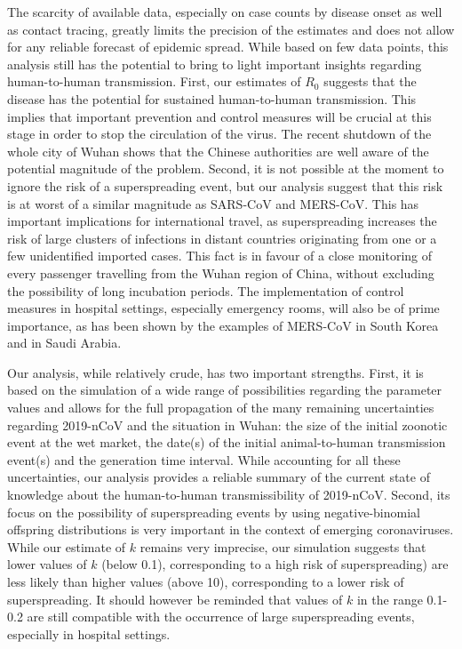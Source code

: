 \documentclass{article}
\begin{document}
The scarcity of available data, especially on case counts by disease onset as well as contact tracing, greatly limits the precision of the estimates and does not allow for any reliable forecast of epidemic spread.
While based on few data points, this analysis still has the potential to bring to light important insights regarding human-to-human transmission.
First, our estimates of $R_0$ suggests that the disease has the potential for sustained human-to-human transmission.
This implies that important prevention and control measures will be crucial at this stage in order to stop the circulation of the virus.
The recent shutdown of the whole city of Wuhan shows that the Chinese authorities are well aware of the potential magnitude of the problem.
Second, it is not possible at the moment to ignore the risk of a superspreading event, but our analysis suggest that this risk is at worst of a similar magnitude as SARS-CoV and MERS-CoV.
This has important implications for international travel, as superspreading increases the risk of large clusters of infections in distant countries originating from one or a few unidentified imported cases.
This fact is in favour of a close monitoring of every passenger travelling from the Wuhan region of China, without excluding the possibility of long incubation periods.
The implementation of control measures in hospital settings, especially emergency rooms, will also be of prime importance, as has been shown by the examples of MERS-CoV in South Korea\cite{oh2015middle} and in Saudi Arabia.\cite{assiri2013hospital} 

Our analysis, while relatively crude, has two important strengths.
First, it is based on the simulation of a wide range of possibilities regarding the parameter values and allows for the full propagation of the many remaining uncertainties regarding 2019-nCoV and the situation in Wuhan: the size of the initial zoonotic event at the wet market, the date(s) of the initial animal-to-human transmission event(s) and the generation time interval.
While accounting for all these uncertainties, our analysis provides a reliable summary of the current state of knowledge about the human-to-human transmissibility of 2019-nCoV.
Second, its focus on the possibility of superspreading events by using negative-binomial offspring distributions is very important in the context of emerging coronaviruses.\cite{Lloyd-Smith:2005,Althaus:2015b}
While our estimate of $k$ remains very imprecise, our simulation suggests that lower values of $k$ (below 0.1), corresponding to a high risk of superspreading) are less likely than higher values (above 10), corresponding to a lower risk of superspreading.
It should however be reminded that values of $k$ in the range 0.1-0.2 are still compatible with the occurrence of large superspreading events, especially in hospital settings.\cite{oh2015middle,assiri2013hospital} 
\end{document}
